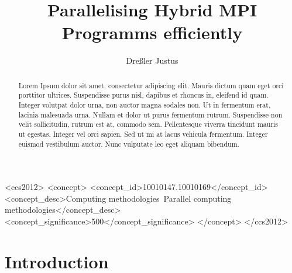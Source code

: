 \documentclass[sigconf]{acmart}
\begin{document}
\title{Parallelising Hybrid MPI Programms efficiently}
\author{Dreßler Justus}


\begin{CCSXML}
    <ccs2012>
    <concept>
    <concept_id>10010147.10010169</concept_id>
    <concept_desc>Computing methodologies~Parallel computing methodologies</concept_desc>
    <concept_significance>500</concept_significance>
    </concept>
    </ccs2012>
\end{CCSXML}


\begin{abstract}

    Lorem Ipsum dolor sit amet, consectetur adipiscing elit.
    Mauris dictum quam eget orci porttitor ultrices.
    Suspendisse purus nisl, dapibus et rhoncus in, eleifend id quam. Integer volutpat dolor urna, non auctor magna sodales non.
    Ut in fermentum erat, lacinia malesuada urna.
    Nullam et dolor ut purus fermentum rutrum.
    Suspendisse non velit sollicitudin, rutrum est at, commodo sem. Pellentesque viverra tincidunt mauris ut egestas.
    Integer vel orci sapien. Sed ut mi at lacus vehicula fermentum.
    Integer euismod vestibulum auctor.
    Nunc vulputate leo eget aliquam bibendum.

\end{abstract}

\maketitle

\section{Introduction}

\end{document}
